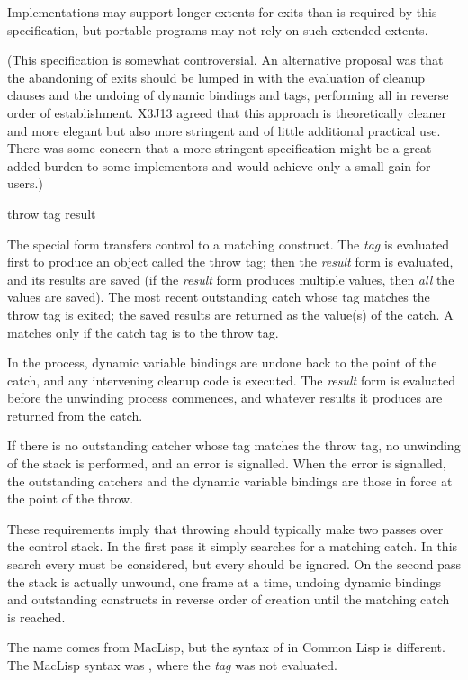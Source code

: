 \begin{defspec}
\begin{newer}
Implementations may support longer extents for exits than is
required by this specification,
but portable programs may not rely on such extended extents.

(This specification is somewhat controversial.  An alternative proposal was
that the abandoning of exits should be lumped in with
the evaluation of  cleanup clauses and the
undoing of dynamic bindings and  tags, performing all
in reverse order of establishment.  X3J13 agreed that this approach is
theoretically cleaner and more elegant but also more stringent
and of little additional practical use.  There was some concern that
a more stringent specification might be a great added burden to some
implementors and would achieve only a small gain for users.)
\end{newer}
\end{defspec}

\begin{defspec}
throw tag result

The  special form transfers control to a matching
 construct.
The \emph{tag} is evaluated first to produce an object
called the throw tag; then the \emph{result} form is evaluated,
and its results are saved (if the \emph{result} form produces
multiple values, then \emph{all} the values are saved).
The most recent outstanding catch whose tag matches the throw tag
is exited; the saved results are returned as the value(s) of the catch.
A  matches only if the catch tag is  to the throw tag.

In the process, dynamic variable
bindings are undone back to the point of the catch, and any intervening
 cleanup code is executed.
The \emph{result} form is evaluated before the unwinding process commences,
and whatever results it produces are returned from the catch.

If there is no outstanding catcher whose tag matches the throw tag,
no unwinding of the stack is performed, and an error is signalled.
When the error is signalled, the outstanding catchers and the dynamic
variable bindings are those in force at the point of the throw.

\beforenoterule
\begin{implementation}
These requirements imply that throwing should typically
make two passes over the control stack.  In the first pass it simply
searches for a matching catch.  In this search every 
must be considered, but every
 should be ignored.  On the second pass the stack
is actually unwound, one frame at a time, undoing dynamic bindings
and outstanding  constructs in reverse order of creation
until the matching catch is reached.
\end{implementation}
\betweennoterule
\begin{incompatibility}
The name  comes from MacLisp,
but the syntax of  in Common Lisp is different.
The MacLisp syntax was ,
where the \emph{tag} was not evaluated.
\end{incompatibility}
\afternoterule
\end{defspec}
